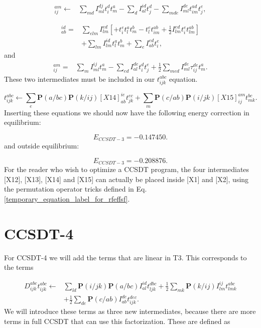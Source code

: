 \begin{align}
[X13]_{ij}^{am} \leftarrow & 
\sum_{md} I_{ml}^{dj} t_i^d t_m^a
- \sum_d I_{al}^{id} t_j^d
- \sum_{mde} I_{ml}^{de} t_{im}^{ad} t_j^e ,
\end{align}

\begin{align}
[X14]_{ab}^{id} = & 
\sum_{elm} I_{lm}^{ed} \left[
+ t_i^e t_l^a t_m^b
- t_l^e t_{im}^{ab} 
+ \frac{1}{2} I_{lm}^{ed} t_i^e t_{lm}^{ab}
\right]
\nonumber \\ &
+ \sum_{lm} I_{lm}^{id} t_l^a t_m^b
+ \sum_e I_{ab}^{ed} t_i^e ,
\end{align}
and
\begin{align}
[X15]_{ij}^{am} = &
\sum_m I_{ml}^{ij} t_m^a
- \sum_{ed} I_{al}^{de} t_i^d t_j^e
+ \frac{1}{2} \sum_{med} I_{ml}^{de} \tau_{ij}^{de} t_m^a  .
\end{align}
These two intermediates must be included in our $t_{ijk}^{abc}$ equation.

\begin{equation}
t_{ijk}^{abc} \leftarrow
\sum_e \textbf{P}(a/bc) \textbf{P}(k/ij)
[X14]_{ab}^{ie} t_{jk}^{ec}
+ \sum_m \textbf{P}(c/ab) \textbf{P}(i/jk)
[X15]_{ij}^{am} t_{mk}^{bc} .
\end{equation}
Inserting these equations we should now have the following energy correction in equilibrium:

\begin{equation}
E_{CCSDT-3} = -0.147450 .
\end{equation}
and outside equilibrium:

\begin{equation}
E_{CCSDT-3} = -0.208876 .
\end{equation}
For the reader who wish to optimize a CCSDT program, the four intermediates [X12], [X13], [X14] and [X15] can actually be placed inside [X1] and [X2], using the permutation operator tricks defined in Eq. \eqref{temporary_equation_label_for_rfeffsf}. \\

\section{CCSDT-4}
For CCSDT-4 we will add the terms that are linear in T3. This corresponds to the terms

\begin{align}
D_{ijk}^{abc} t_{ijk}^{abc} \leftarrow &
\sum _{ld}
\textbf{P}(i/jk) \textbf{P}(a/bc) 
I_{al}^{id} t^{dbc}_{ljk}
+
\frac{1}{2} \sum_{mk}
\textbf{P}(k/ij) I_{lm}^{ij} t_{lmk}^{abc}
\nonumber \\ &
+
\frac{1}{2} \sum_{de} 
\textbf{P}(c/ab) I_{ab}^{de} t^{dec}_{ijk} .
\end{align}
We will introduce these terms as three new intermediates, because there are more terms in full CCSDT that can use this factorization. These are defined as

